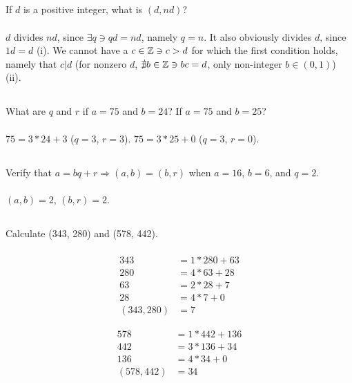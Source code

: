 \documentclass{article}
\begin{document}
\subsection{}
If $d$ is a positive integer, what is $(d, nd)$? \\~\\
$d$ divides $nd$, since $\exists q \ni qd = nd$, namely $q = n$.
It also obviously divides $d$, since $1d = d$ (i).
We cannot have a $c \in \mathbb{Z} \ni c > d$ for which the first condition holds,
namely that $c|d$ (for nonzero $d$, $\nexists b \in \mathbb{Z} \ni bc = d$, only non-integer $b \in (0, 1)$) (ii).

\subsection{}
What are $q$ and $r$ if $a = 75$ and $b = 24$? If $a = 75$ and $b = 25$?\\~\\
$75 = 3 * 24 + 3$ ($q = 3$, $r = 3$). $75 = 3 * 25 + 0$ ($q = 3$, $r = 0$).

\subsection{}
Verify that $a = bq + r \Rightarrow (a, b) = (b, r)$ when $a = 16$, $b = 6$, and $q = 2$.\\~\\
$(a, b) = 2$, $(b, r) = 2$.

\subsection{}
Calculate (343, 280) and (578, 442).\\~\\
\begin{align}
  343 &= 1 * 280 + 63 \\
  280 &= 4 * 63 + 28 \\
  63 &= 2 * 28 + 7 \\
  28 &= 4 * 7 + 0 \\
  (343, 280) &= 7
\end{align}

\begin{align}
  578 &= 1 * 442 + 136 \\
  442 &= 3 * 136 + 34 \\
  136 &= 4 * 34 + 0 \\
  (578, 442) &= 34
\end{align}
\end{document}
